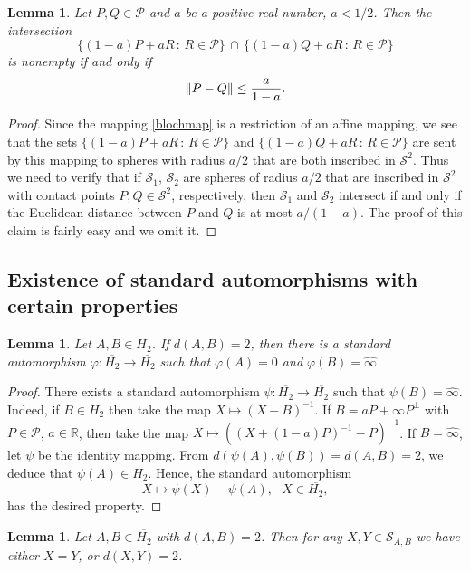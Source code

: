 \documentclass[10pt,a4paper]{amsart}
\newcommand\cP{{\mathcal{P}}}
\newcommand\oH{{\overline{H_2}}}
\newcommand\oi{{\widehat{\infty}}}
\newtheorem{lemma}[theorem]{Lemma}
\theoremstyle{definition}
\theoremstyle{remark}
\numberwithin{subsection}{section}
\numberwithin{equation}{section}
\begin{document}
\begin{lemma}\label{mikar}
Let $P,Q \in \mathcal{P}$ and $a$ be a positive real number, $a < 1/2$. Then the intersection
\[
\{ (1-a) P + aR \, : \, R\in \mathcal{P} \} \, \cap \, \{ (1-a) Q + aR \, : \, R\in \mathcal{P} \}
\]
is nonempty if and only if
\[
\| P - Q \| \le { a \over 1-a }.
\]
\end{lemma}
\begin{proof}
Since the mapping \eqref{blochmap} is a restriction of an affine mapping, we see that the sets $\{ (1-a) P + aR \, : \, R\in \mathcal{P} \}$ and $\{ (1-a) Q + aR \, : \, R\in \mathcal{P} \}$ are sent by this mapping to spheres with radius $a/2$ that are both inscribed in $\mathcal{S}^2$.
Thus we need to verify that if
$\mathcal{S}_1$, $\mathcal{S}_2$ are spheres of radius $a/2$ that are inscribed in $\mathcal{S}^2$ with contact points $P, Q\in \mathcal{S}^2$, respectively, 
then $\mathcal{S}_1$ and $\mathcal{S}_2$ intersect if and only if the Euclidean distance between $P$ and $Q$ is at most $a/(1-a)$.
The proof of this claim is fairly easy and we omit it.
\end{proof}





\subsection{Existence of standard automorphisms with certain properties}\label{existence}
\begin{lemma}\label{pocelo}
Let $A,B \in \oH$. If $d(A,B) = 2$, then there is a standard automorphism $\varphi \colon \oH \to \oH$ such that $\varphi (A) = 0$ and $\varphi (B) = {\oi}$.
\end{lemma}
\begin{proof}
There exists a standard automorphism $\psi \colon \oH \to \oH$ such that $\psi (B) = {\oi}$. 
Indeed, if $B\in H_2$ then take the map $X\mapsto (X-B)^{-1}$. 
If $B=aP+\infty P^\perp$ with $P\in \cP$, $a\in \mathbb{R}$, then take the map $X\mapsto ((X+(1-a)P)^{-1}-P)^{-1}$.
If $B=\oi$, let $\psi$ be the identity mapping.
From $d(\psi (A), \psi (B)) = d(A,B) = 2$, we deduce that $\psi(A) \in H_2$. Hence, the standard automorphism
\[
X \mapsto \psi (X) - \psi (A), \ \ \ X \in \oH,
\]
has the desired property.
\end{proof}

\begin{lemma}\label{pjanck}
Let $A,B \in \oH$ with $d(A,B) =2$. Then for any $X,Y \in \mathcal{S}_{A,B}$ we have either $X=Y$, or $d(X,Y) =2$.
\end{lemma}
\end{document}
